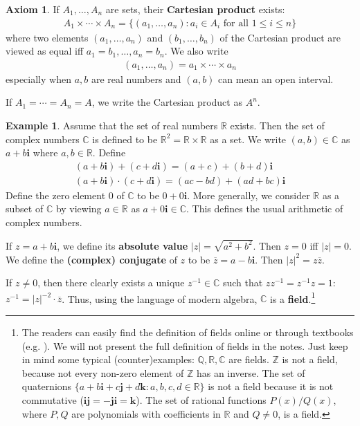 \documentclass[12pt,b5paper,notitlepage]{article}
\theoremstyle{definition}
\newtheorem{eg}[df]{Example}
\newtheorem*{axiom}{Axiom}
\theoremstyle{plain}
\newcommand{\ovl}{\overline}
\newcommand{\im}{\mathbf{i}}
\newcommand{\Cbb}{\mathbb C}
\newcommand{\Zbb}{\mathbb Z}
\newcommand{\Qbb}{\mathbb Q}
\newcommand{\Rbb}{\mathbb R}
\numberwithin{equation}{section}
\begin{document}
\begin{axiom}
If $A_1,\dots,A_n$ are sets, their \textbf{Cartesian product} exists:
\begin{align*}
A_1\times\cdots\times A_n=\{(a_1,\dots,a_n): a_i\in A_i\text{ for all }1\leq i\leq n\}
\end{align*}
where two elements $(a_1,\dots,a_n)$ and $(b_1,\dots,b_n)$ of the Cartesian product are viewed as equal iff $a_1=b_1,\dots,a_n=b_n$. We also write
\begin{align*}
(a_1,\dots,a_n)=a_1\times\cdots\times a_n
\end{align*}
especially when $a,b$ are real numbers and $(a,b)$ can mean an open interval.

If $A_1=\cdots=A_n=A$, we write the Cartesian product as $A^n$. \hfill\qedsymbol
\end{axiom}

\begin{eg}
Assume that the set of real numbers $\Rbb$ exists. Then the set of complex numbers $\Cbb$ \index{C@$\Cbb$, the set of complex numbers} is defined to be $\Rbb^2=\Rbb\times\Rbb$ as a set. We write $(a,b)\in\Cbb$ as $a+b\im$ where $a,b\in\Rbb$. Define
\begin{gather*}
(a+b\im)+(c+d\im)=(a+c)+(b+d)\im\\
(a+b\im)\cdot (c+d\im)=(ac-bd)+(ad+bc)\im
\end{gather*}
Define the zero element $0$ of $\Cbb$ to be $0+0\im$. More generally, we consider $\Rbb$ as a subset of $\Cbb$ by viewing $a\in\Rbb$ as $a+0\im\in\Cbb$. This defines the usual arithmetic of complex numbers. 

If $z=a+b\im$, we define its \textbf{absolute value} $|z|=\sqrt{a^2+b^2}$. Then $z=0$ iff $|z|=0$. We define the \textbf{(complex) conjugate} of $z$ to be $\ovl z=a-b\im$. Then $|z|^2=z\ovl z$.

If $z\neq 0$, then there clearly exists a unique $z^{-1}\in\Cbb$ such that $zz^{-1}=z^{-1}z=1$:  $z^{-1}=|z|^{-2}\cdot \ovl z$. Thus, using the language of modern algebra, $\Cbb$ is a  \textbf{field}.\footnote{The readers can easily find the definition of fields online or through textbooks (e.g. \cite[Def. 1.12]{Rud-P}). We will not present the full definition of fields in the notes. Just keep in mind some typical (counter)examples: $\Qbb,\Rbb,\Cbb$ are fields. $\Zbb$ is not a field, because not every non-zero element of $\Zbb$ has an inverse. The set of quaternions $\{a+b\im+c\mathbf{j}+d\mathbf{k}: a,b,c,d\in\Rbb\}$ is not a field because it is not commutative ($\im\mathbf{j}=-\mathbf{j}\im=\mathbf{k}$). The set of rational functions $P(x)/Q(x)$, where $P,Q$ are polynomials with coefficients in $\Rbb$ and $Q\neq 0$, is a field.}  \hfill\qedsymbol
\end{eg}
\end{document}
